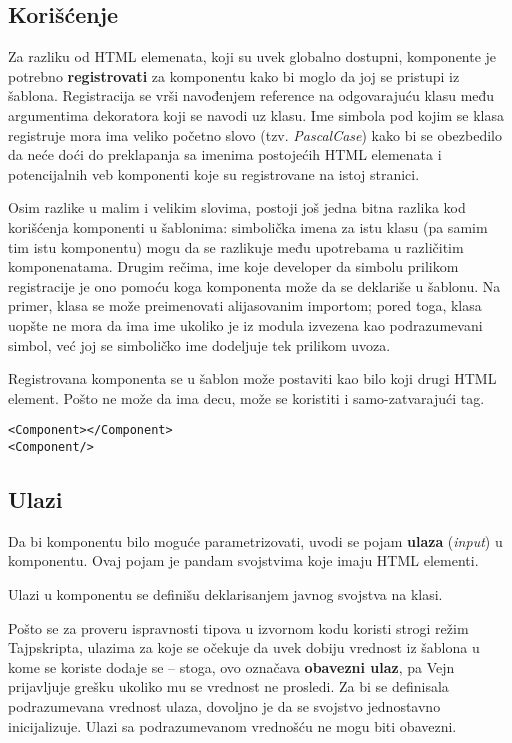 \subsection{Korišćenje}

Za razliku od HTML elemenata, koji su uvek globalno dostupni, komponente je potrebno \textbf{registrovati} za komponentu kako bi moglo da joj se pristupi iz šablona.
Registracija se vrši navođenjem reference na odgovarajuću klasu među argumentima dekoratora  koji se navodi uz klasu.
Ime simbola pod kojim se klasa registruje mora ima veliko početno slovo (tzv. \textsl{PascalCase}) kako bi se obezbedilo da neće doći do preklapanja sa imenima postojećih HTML elemenata i potencijalnih veb komponenti koje su registrovane na istoj stranici.

Osim razlike u malim i velikim slovima, postoji još jedna bitna razlika kod korišćenja komponenti u šablonima: simbolička imena za istu klasu (pa samim tim istu komponentu) mogu da se razlikuje među upotrebama u različitim komponenatama.
Drugim rečima, ime koje developer da simbolu prilikom registracije je ono pomoću koga komponenta može da se deklariše u šablonu.
Na primer, klasa se može preimenovati alijasovanim importom; pored toga, klasa uopšte ne mora da ima ime ukoliko je iz modula izvezena kao podrazumevani simbol, već joj se simboličko ime dodeljuje tek prilikom uvoza.

Registrovana komponenta se u šablon može postaviti kao bilo koji drugi HTML element.
Pošto ne može da ima decu, može se koristiti i samo-zatvarajući tag.

\begin{verbatim}
<Component></Component>
<Component/>
\end{verbatim}

\subsection{Ulazi}

Da bi komponentu bilo moguće parametrizovati, uvodi se pojam  \textbf{ulaza} (\textsl{input}) u komponentu.
Ovaj pojam je pandam svojstvima koje imaju HTML elementi.

Ulazi u komponentu se definišu deklarisanjem javnog svojstva na klasi.

Pošto se za proveru ispravnosti tipova u izvornom kodu koristi strogi režim Tajpskripta, ulazima za koje se očekuje da uvek dobiju vrednost iz šablona u kome se koriste dodaje se \code{!} -- stoga, ovo označava \textbf{obavezni ulaz}, pa Vejn prijavljuje grešku ukoliko mu se vrednost ne prosledi.
Za bi se definisala podrazumevana vrednost ulaza, dovoljno je da se svojstvo jednostavno inicijalizuje.
Ulazi sa podrazumevanom vrednošću ne mogu biti obavezni.

